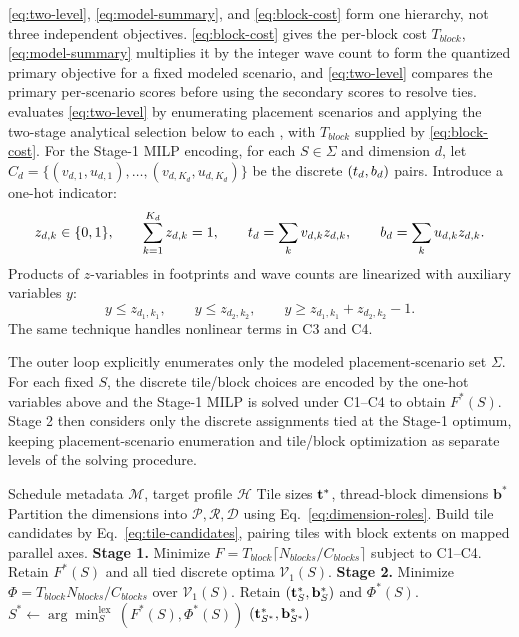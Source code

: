 \autoref{eq:two-level}, \autoref{eq:model-summary}, and \autoref{eq:block-cost} form one hierarchy, not three independent objectives. \autoref{eq:block-cost} gives the per-block cost \(T_{\mathit{block}}\), \autoref{eq:model-summary} multiplies it by the integer wave count to form the quantized primary objective for a fixed modeled scenario, and \autoref{eq:two-level} compares the primary per-scenario scores before using the secondary scores to resolve ties. \name evaluates \autoref{eq:two-level} by enumerating placement scenarios and applying the two-stage analytical selection below to each , with \(T_{\mathit{block}}\) supplied by \autoref{eq:block-cost}. For the Stage-1 MILP encoding, for each \(S\in\Sigma\) and dimension \(d\), let
\(C_d=\{(v_{d,1},u_{d,1}),\ldots,(v_{d,K_d},u_{d,K_d})\}\) be the discrete
\((t_d,b_d)\) pairs. Introduce a one-hot indicator:
\[
z_{d,k}\in\{0,1\},
\qquad \sum_{k=1}^{K_d}z_{d,k}=1,
\qquad t_d=\sum_k v_{d,k}z_{d,k},
\qquad b_d=\sum_k u_{d,k}z_{d,k}.
\]
Products of \(z\)-variables in footprints and wave counts are linearized with
auxiliary variables \(y\):
\[
y\le z_{d_1,k_1},
\qquad y\le z_{d_2,k_2},
\qquad y\ge z_{d_1,k_1}+z_{d_2,k_2}-1.
\]
The same technique handles nonlinear terms in C3 and C4.

The outer loop explicitly enumerates only the modeled placement-scenario set \(\Sigma\). For each fixed \(S\), the discrete tile/block choices are encoded by the one-hot variables above and the Stage-1 MILP is solved under C1--C4 to obtain \(F^*(S)\). Stage 2 then considers only the discrete assignments tied at the Stage-1 optimum, keeping placement-scenario enumeration and tile/block optimization as separate levels of the solving procedure.

\begin{algorithm}[tbp]
\small
\ifrevmarkup{}\fi
\caption{}\label{alg:mosaic}
\begin{revRtwoblock}
\begin{algorithmic}[1]
\Require Schedule metadata \(\mathcal{M}\), target profile \(\mathcal{H}\)
\Ensure Tile sizes \(\mathbf{t}^*\), thread-block dimensions \(\mathbf b^*\)
\State Partition the dimensions into \(\mathcal P,\mathcal R,\mathcal D\) using Eq.~\eqref{eq:dimension-roles}. Build tile candidates by Eq.~\eqref{eq:tile-candidates}, pairing tiles with block extents on mapped parallel axes.
  \State \textbf{Stage 1.} Minimize \(F=T_{\mathit{block}}\lceil N_{\mathit{blocks}}/C_{\mathit{blocks}}\rceil\) subject to C1--C4. Retain \(F^*(S)\) and all tied discrete optima \(\mathcal V_1(S)\).
  \State \textbf{Stage 2.} Minimize \(\Phi=T_{\mathit{block}}N_{\mathit{blocks}}/C_{\mathit{blocks}}\) over \(\mathcal V_1(S)\). Retain \((\mathbf{t}_S^*,\mathbf b_S^*)\) and \(\Phi^*(S)\).
\EndFor
\State \(S^*\gets\arg\min_S^{\mathrm{lex}}\,(F^*(S),\Phi^*(S))\)
\State \Return \((\mathbf{t}_{S^*}^*,\mathbf b_{S^*}^*)\) 
\end{algorithmic}
\end{revRtwoblock}
\end{algorithm}

